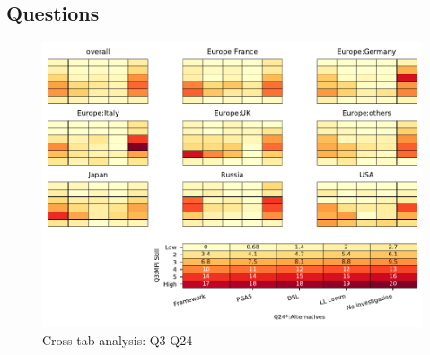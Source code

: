 
\subsection{Questions}


\begin{figure}
\begin{center}
\includegraphics[width=12cm]{../pdfs/Q3-Q24.pdf}
\caption{Cross-tab analysis: Q3-Q24}
\label{fig:Q3-Q24}
\end{center}
\end{figure}
